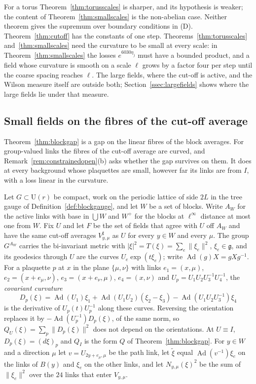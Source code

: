 \documentclass[11pt]{amsart}
\theoremstyle{definition}
\theoremstyle{remark}
\numberwithin{equation}{section}
\newcommand{\U}{\mathrm{U}}
\newcommand{\g}{\mathfrak{g}}
\begin{document}
For a torus Theorem~\ref{thm:torusscales} is sharper, and its hypothesis is
weaker; the content of Theorem~\ref{thm:smallscales} is the non-abelian
case. Neither theorem gives the
supremum over boundary conditions in (D). Theorem~\ref{thm:cutoff} has the
constants of one step. Theorems~\ref{thm:torusscales}
and~\ref{thm:smallscales} need the curvature to be small at every scale:
in Theorem~\ref{thm:smallscales} the losses $e^{6030\eta_j}$ must have a
bounded product, and a field whose curvature is smooth on a scale $\ell$
grows by a factor four per step until the coarse spacing reaches $\ell$.
The large fields, where the cut-off is active, and the Wilson measure
itself are outside both; Section~\ref{ssec:largefields} shows where the large
fields lie under that measure.



\subsection{Small fields on the fibres of the cut-off average}\label{ssec:smallfibres}

Theorem~\ref{thm:blockgap} is a gap on the linear fibres of the block
averages. For group-valued links the fibres of the cut-off average are
curved, and Remark~\ref{rem:constrainedopen}(b) asks whether the gap
survives on them. It does at every background whose plaquettes are small,
however far its links are from $I$, with a loss linear in the curvature.

Let $G\subset\U(r)$ be compact, work on the periodic lattice of side $2L$ in
the tree gauge of Definition~\ref{def:blockgauge}, and let $W$ be a set of
blocks. Write $A_W$ for the active links with base in $\bigcup W$ and $W^+$
for the blocks at $\ell^\infty$ distance at most one from $W$. Fix $U$ and
let $F$ be the set of fields that agree with $U$ off $A_W$ and have the same
cut-off averages $V^\sharp_{y,\mu}$ as $U$ for every $y\in W$ and every
$\mu$. The group $G^{A_W}$ carries the bi-invariant metric with $|\xi|^2=
T(\xi)=\sum_e\lVert\xi_e\rVert^2$, $\xi_e\in\g$, and its geodesics through
$U$ are the curves $U_e\exp(t\xi_e)$; write $\operatorname{Ad}(g)X=gXg^{-1}$.
For a plaquette $p$ at $x$ in the plane $\{\mu,\nu\}$ with links $e_1=(x,
\mu)$, $e_2=(x+e_\mu,\nu)$, $e_3=(x+e_\nu,\mu)$, $e_4=(x,\nu)$ and $U_p=U_1U_2
U_3^{-1}U_4^{-1}$, the \emph{covariant curvature}
\[
D_p(\xi)=\operatorname{Ad}(U_1)\xi_1+\operatorname{Ad}(U_1U_2)(\xi_2-\xi_3)
-\operatorname{Ad}(U_1U_2U_3^{-1})\xi_4
\]
is the derivative of $U_p(t)U_p^{-1}$ along these curves. Reversing the
orientation replaces it by $-\operatorname{Ad}(U_p^{-1})D_p(\xi)$, of the
same norm, so $Q_U(\xi)=\sum_p\lVert D_p(\xi)\rVert^2$ does not depend on
the orientations. At $U\equiv I$, $D_p(\xi)=(d\xi)_p$ and $Q_I$ is the form
$Q$ of Theorem~\ref{thm:blockgap}. For $y\in W$ and a direction $\mu$ let
$v=U_{2y+e_\mu,\mu}$ be the path link, let $\tilde\xi$ equal
$\operatorname{Ad}(v^{-1})\xi_e$ on the links of $B(y)$ and $\xi_e$ on the
other links, and let $N_{y,\mu}(\xi)^2$ be the sum of $\lVert\xi_e
\rVert^2$ over the $24$ links that enter $V_{y,\mu}$.
\end{document}
